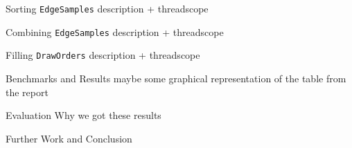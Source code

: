 \documentclass[slidestop,compress,mathserif, xcolor=table]{beamer}
\begin{document}
\begin{frame}[c]{Sorting \texttt{EdgeSamples}}
description + threadscope
\end{frame}

\begin{frame}[c]{Combining \texttt{EdgeSamples}}
description + threadscope
\end{frame}

\begin{frame}[c]{Filling \texttt{DrawOrders}}
description + threadscope
\end{frame}

\begin{frame}[c]{Benchmarks and Results}
maybe some graphical representation of the table from the report
\end{frame}

\begin{frame}[c]{Evaluation}
Why we got these results
\end{frame}

\begin{frame}[c]{Further Work and Conclusion}
\end{frame}
\end{document}
